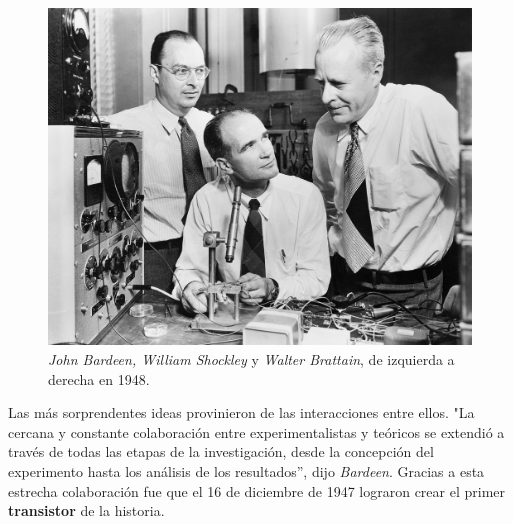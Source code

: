 \begin{figure}[htb]
	\centering
	\includegraphics[scale = 0.13]{Graphics/Bardeen_Shockley_Brattain_1948.jpg}
\caption{\emph{John Bardeen, William Shockley} y \emph{Walter Brattain}, de izquierda a derecha en 1948.}
	\label{fig:2}
\end{figure}

Las más sorprendentes ideas provinieron de las interacciones entre ellos. "La cercana y constante colaboración entre
experimentalistas y teóricos se extendió a través de todas las etapas de la investigación, desde la concepción del
experimento hasta los análisis de los resultados”, dijo \emph{Bardeen}. Gracias a esta estrecha colaboración fue que 
el 16 de diciembre de 1947 lograron crear el primer \textbf{transistor} de la historia.\\

